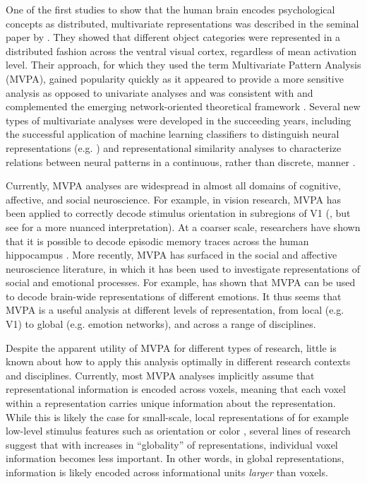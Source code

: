 \documentclass[12pt,a4paper]{article}\usepackage[]{graphicx}\usepackage[]{color}
\begin{document}
One of the first studies to show that the human brain encodes psychological concepts as distributed, multivariate representations was described in the seminal paper by \cite{haxby2001}. They showed that different object categories were represented in a distributed fashion across the ventral visual cortex, regardless of mean activation level. Their approach, for which they used the term Multivariate Pattern Analysis (MVPA), gained popularity quickly as it appeared to provide a more sensitive analysis as opposed to univariate analyses \citep{norman2006,mahmoudi2012} and was consistent with and complemented the emerging network-oriented theoretical framework \citep{bressler2010}. Several new types of multivariate analyses were developed in the succeeding years, including the successful application of machine learning classifiers to distinguish neural representations (e.g. \citealp{cox2003}) and representational similarity analyses to characterize relations between neural patterns in a continuous, rather than discrete, manner \citep{kriegeskorte2008}. 

Currently, MVPA analyses are widespread in almost all domains of cognitive, affective, and social neuroscience. For example, in vision research, MVPA has been applied to correctly decode stimulus orientation in subregions of V1 (\citealp{kamitani2005}, but see \citealp{opdebeeck2010} for a more nuanced interpretation). At a coarser scale, researchers have shown that it is possible to decode episodic memory traces across the human hippocampus \citep{chadwick2010}. More recently, MVPA has surfaced in the social and affective neuroscience literature, in which it has been used to investigate representations of social and emotional processes. For example, \cite{kassam2013} has shown that MVPA can be used to decode brain-wide representations of different emotions. It thus seems that MVPA is a useful analysis at different levels of representation, from local (e.g. V1) to global (e.g. emotion networks), and across a range of disciplines.     

Despite the apparent utility of MVPA for different types of research, little is known about how to apply this analysis optimally in different research contexts and disciplines. Currently, most MVPA analyses implicitly assume that representational information is encoded across voxels, meaning that each voxel within a representation carries unique information about the representation. While this is likely the case for small-scale, local representations of for example low-level stimulus features such as orientation \cite{kamitani2005} or color \citep{brouwer2009}, several lines of research suggest that with increases in ``globality'' of representations, individual voxel information becomes less important. In other words, in global representations, information is likely encoded across informational units \emph{larger} than voxels. 
\end{document}

